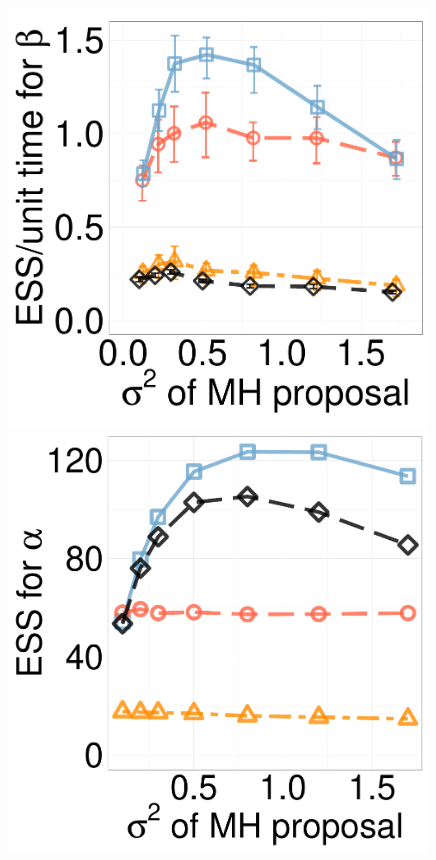 \begin{figure}[H]
\begin{minipage}[hp]{0.24\linewidth}
	\end{minipage}
  \begin{minipage}[hp]{0.24\linewidth}
  \centering
    \includegraphics [width=0.99\textwidth, angle=0]{figs/new_experiment_figs/exp_beta_dim10_k2.pdf}
	\end{minipage}
  \centering
  \begin{minipage}[!hp]{0.24\linewidth}
  \centering
    \includegraphics [width=0.99\textwidth, angle=0]{figs/ess/EXP_D3alpha_k2.pdf}

\end{minipage}
\end{figure}
